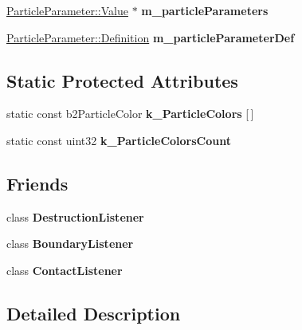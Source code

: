 \begin{DoxyCompactItemize}
\item 
\hypertarget{classTest_a06702c85024baa29a49241f8da875d1c}{\hyperlink{structParticleParameter_1_1Value}{Particle\-Parameter\-::\-Value} $\ast$ {\bfseries m\-\_\-particle\-Parameters}}\label{classTest_a06702c85024baa29a49241f8da875d1c}

\item 
\hypertarget{classTest_af526852ab6e9911dc2a4ccf47401fe91}{\hyperlink{structParticleParameter_1_1Definition}{Particle\-Parameter\-::\-Definition} {\bfseries m\-\_\-particle\-Parameter\-Def}}\label{classTest_af526852ab6e9911dc2a4ccf47401fe91}

\end{DoxyCompactItemize}
\subsection*{Static Protected Attributes}
\begin{DoxyCompactItemize}
\item 
static const b2\-Particle\-Color {\bfseries k\-\_\-\-Particle\-Colors} \mbox{[}$\,$\mbox{]}
\item 
static const uint32 {\bfseries k\-\_\-\-Particle\-Colors\-Count}
\end{DoxyCompactItemize}
\subsection*{Friends}
\begin{DoxyCompactItemize}
\item 
\hypertarget{classTest_a070117113adbe4bd234cc819a8a31d67}{class {\bfseries Destruction\-Listener}}\label{classTest_a070117113adbe4bd234cc819a8a31d67}

\item 
\hypertarget{classTest_ace42de2cf55b34c2abc668b911b4fc70}{class {\bfseries Boundary\-Listener}}\label{classTest_ace42de2cf55b34c2abc668b911b4fc70}

\item 
\hypertarget{classTest_aea5531aaede6e9afc2c156b067c847d4}{class {\bfseries Contact\-Listener}}\label{classTest_aea5531aaede6e9afc2c156b067c847d4}

\end{DoxyCompactItemize}


\subsection{Detailed Description}


